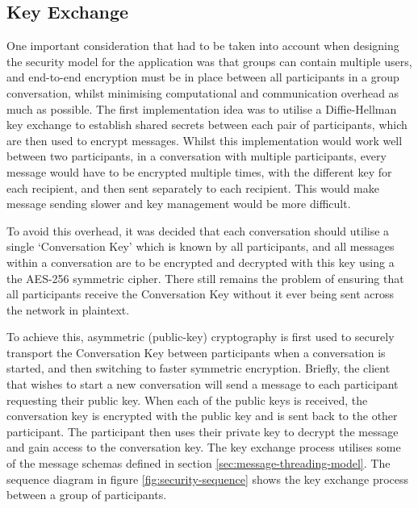\subsection{Key Exchange}
One important consideration that had to be taken into account when designing the security model for the application was that groups can contain multiple users, and end-to-end encryption must be in place between all participants in a group conversation, whilst minimising computational and communication overhead as much as possible. The first implementation idea was to utilise a Diffie-Hellman key exchange to establish shared secrets between each pair of participants, which are then used to encrypt messages. Whilst this implementation would work well between two participants, in a conversation with multiple participants, every message would have to be encrypted multiple times, with the different key for each recipient, and then sent separately to each recipient. This would make message sending slower and key management would be more difficult.

To avoid this overhead, it was decided that each conversation should utilise a single `Conversation Key' which is known by all participants, and all messages within a conversation are to be encrypted and decrypted with this key using a the AES-256 symmetric cipher. There still remains the problem of ensuring that all participants receive the Conversation Key without it ever being sent across the network in plaintext.

To achieve this, asymmetric (public-key) cryptography is first used to securely transport the Conversation Key between participants when a conversation is started, and then switching to faster symmetric encryption. Briefly, the client that wishes to start a new conversation will send a message to each participant requesting their public key. When each of the public keys is received, the conversation key is encrypted with the public key and is sent back to the other participant. The participant then uses their private key to decrypt the message and gain access to the conversation key. The key exchange process utilises some of the message schemas defined in section \ref{sec:message-threading-model}. The sequence diagram in figure \ref{fig:security-sequence} shows the key exchange process between a group of participants.

